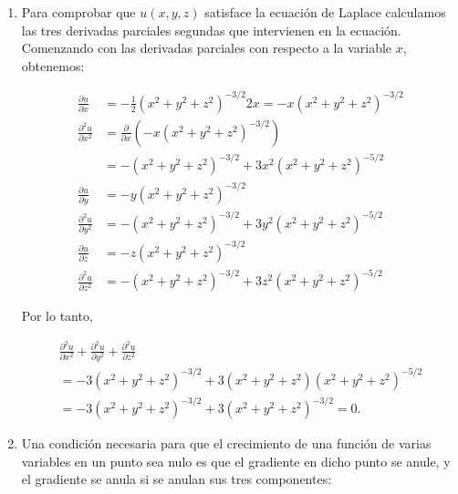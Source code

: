 \documentclass[
  spanish,
  a4paper,
]{scrreport}
\theoremstyle{definition}
\theoremstyle{remark}
\begin{document}
\begin{tcolorbox}[enhanced jigsaw, arc=.35mm, bottomrule=.15mm, bottomtitle=1mm, breakable, colback=white, colbacktitle=quarto-callout-tip-color!10!white, colframe=quarto-callout-tip-color-frame, coltitle=black, left=2mm, leftrule=.75mm, opacityback=0, opacitybacktitle=0.6, rightrule=.15mm, title=\textcolor{quarto-callout-tip-color}{\faLightbulb}\hspace{0.5em}{Solución}, titlerule=0mm, toprule=.15mm, toptitle=1mm]

\begin{enumerate}
\def\labelenumi{\alph{enumi}.}
\item
  Para comprobar que \(u(x,y,z)\) satisface la ecuación de Laplace
  calculamos las tres derivadas parciales segundas que intervienen en la
  ecuación. Comenzando con las derivadas parciales con respecto a la
  variable \(x\), obtenemos:

  \begin{align*}
  \frac{{\partial u}}{{\partial x}} 
  &=  - \frac{1}{2}\left( {x^2  + y^2 + z^2 } \right)^{ - 3/2} 2x 
  =  - x\left( {x^2  + y^2  + z^2 }\right)^{ - 3/2} \\
  \frac{{\partial ^2 u}}{{\partial x^2 }} 
  &= \frac{\partial }{{\partial x}}\left( { - x\left( {x^2  + y^2  + z^2 } \right)^{ - 3/2} } \right) \\
  &=  - \left( {x^2  + y^2  + z^2 } \right)^{ - 3/2}  + 3x^2 \left( {x^2  + y^2  + z^2 } \right)^{ - 5/2} \\
  \frac{{\partial u}}{{\partial y}} 
  &= - y\left( {x^2  + y^2  + z^2 } \right)^{ - 3/2} \\
  \frac{{\partial ^2 u}}{{\partial y^2 }} 
  &=  - \left( {x^2  + y^2  + z^2 } \right)^{ - 3/2}  + 3y^2 \left( {x^2  + y^2  + z^2 } \right)^{- 5/2} \\
  \frac{{\partial u}}{{\partial z}} 
  &=  - z\left( {x^2  + y^2  + z^2 } \right)^{ - 3/2} \\
  \frac{{\partial ^2 u}}{{\partial z^2 }} 
  &=  - \left( {x^2  + y^2  + z^2 } \right)^{ - 3/2}  + 3z^2 \left( {x^2  + y^2  + z^2 } \right)^{- 5/2}
  \end{align*}

  Por lo tanto,

  \[
  \begin{gathered}
  \frac{{\partial ^2 u}}{{\partial x^2 }} + \frac{{\partial ^2
  u}}{{\partial y^2 }} + \frac{{\partial ^2 u}}{{\partial z^2 }} \\
  =  -3\left( {x^2  + y^2  + z^2 } \right)^{ - 3/2}  + 3\left( {x^2  + y^2
  + z^2 } \right)\left( {x^2  + y^2  + z^2 } \right)^{ - 5/2}  \\
  =- 3\left( {x^2  + y^2  + z^2 } \right)^{ - 3/2}  + 3\left( {x^2  +
  y^2 + z^2 } \right)^{ - 3/2}  = 0.
  \end{gathered}
  \]
\item
  Una condición necesaria para que el crecimiento de una función de
  varias variables en un punto sea nulo es que el gradiente en dicho
  punto se anule, y el gradiente se anula si se anulan sus tres
  componentes:


\end{enumerate}
\end{tcolorbox}
\end{document}
